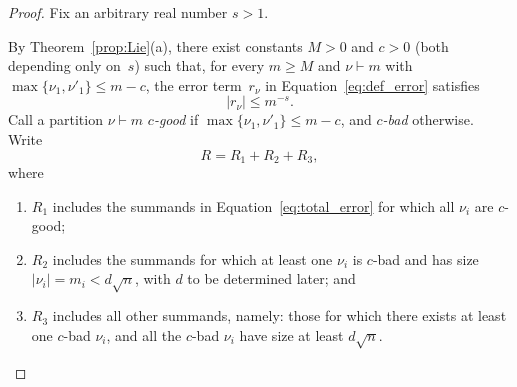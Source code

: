 \documentclass[12pt]%
{amsart}
\def\red#1{{\color{red}{#1}}}
\theoremstyle{plain}
\theoremstyle{definition}
\theoremstyle{remark}
\begin{document}
\begin{proof}


Fix an arbitrary real number $s > 1$. %

By Theorem~\ref{prop:Lie}(a), there exist constants $M > 0$ and $c > 0$ (both depending only on~$s$) such that, for every $m \ge M$ and $\nu \vdash m$ with $\max\{\nu_1, \nu'_1\} \le m-c$, the error term~$r_\nu$ in Equation~\eqref{eq:def_error} satisfies
\[
    |r_\nu| \le m^{-s}.
\]
Call a partition $\nu \vdash m$ {\em 
$c$-good} if $\max\{\nu_1,\nu'_1\} \le m-c$, and {\em $c$-bad} otherwise.
Write 
\[
    R = R_1 + R_2 + R_3,
\]
where
\begin{enumerate}

    \item 
    $R_1$ includes the summands in Equation~\eqref{eq:total_error} for which all $\nu_i$ are $c$-good; 

    \item 
    $R_2$ includes the summands for which at least one $\nu_i$ is $c$-bad and has size $|\nu_i| = m_i < d \sqrt n$, with $d$ to be determined later; and

    \item 
    $R_3$ includes all other summands,
    namely: those for which there exists at least one $c$-bad $\nu_i$, and all the $c$-bad $\nu_i$ have size at least $d \sqrt n$.
        
\end{enumerate}


\end{proof}
\end{document}
